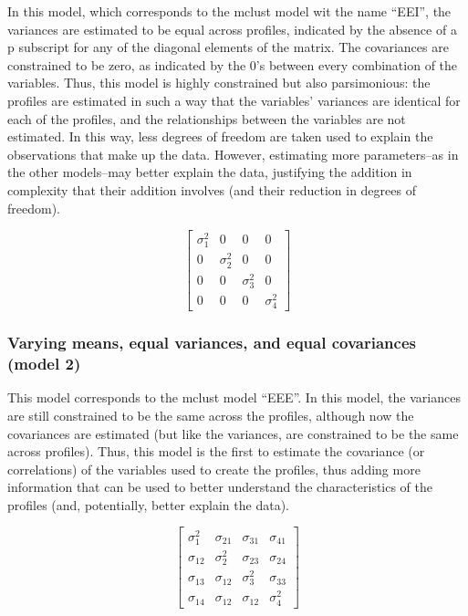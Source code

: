 \documentclass[]{book}
\theoremstyle{definition}
\theoremstyle{definition}
\theoremstyle{definition}
\theoremstyle{remark}
\begin{document}
In this model, which corresponds to the mclust model wit the name
``EEI'', the variances are estimated to be equal across profiles,
indicated by the absence of a p subscript for any of the diagonal
elements of the matrix. The covariances are constrained to be zero, as
indicated by the 0's between every combination of the variables. Thus,
this model is highly constrained but also parsimonious: the profiles are
estimated in such a way that the variables' variances are identical for
each of the profiles, and the relationships between the variables are
not estimated. In this way, less degrees of freedom are taken used to
explain the observations that make up the data. However, estimating more
parameters--as in the other models--may better explain the data,
justifying the addition in complexity that their addition involves (and
their reduction in degrees of freedom).

\[
\left[ \begin{matrix} { \sigma  }_{ 1 }^{ 2 } & 0 & 0 & 0 \\ 0 & { \sigma  }_{ 2 }^{ 2 } & 0 & 0 \\ 0 & 0 & { \sigma  }_{ 3 }^{ 2 } & 0 \\ 0 & 0 & 0 & { \sigma  }_{ 4 }^{ 2 } \end{matrix} \right] 
\]

\subsubsection{Varying means, equal variances, and equal covariances
(model
2)}\label{varying-means-equal-variances-and-equal-covariances-model-2}

This model corresponds to the mclust model ``EEE''. In this model, the
variances are still constrained to be the same across the profiles,
although now the covariances are estimated (but like the variances, are
constrained to be the same across profiles). Thus, this model is the
first to estimate the covariance (or correlations) of the variables used
to create the profiles, thus adding more information that can be used to
better understand the characteristics of the profiles (and, potentially,
better explain the data).

\[
\left[ \begin{matrix} { \sigma  }_{ 1 }^{ 2 } & { \sigma  }_{ 21 } & { \sigma  }_{ 31 } & { \sigma  }_{ 41 } \\ { \sigma  }_{ 12 } & { \sigma  }_{ 2 }^{ 2 } & { \sigma  }_{ 23 } & { \sigma  }_{ 24 } \\ { \sigma  }_{ 13 } & { \sigma  }_{ 12 } & { \sigma  }_{ 3 }^{ 2 } & { \sigma  }_{ 33 } \\ { \sigma  }_{ 14 } & { \sigma  }_{ 12 } & { \sigma  }_{ 12 } & { \sigma  }_{ 4 }^{ 2 } \end{matrix} \right] 
\]
\end{document}
